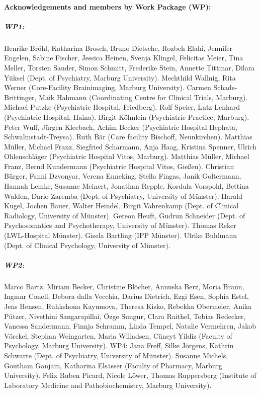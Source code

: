 \documentclass{article}
\begin{document}
    \paragraph{Acknowledgements and members by Work Package (WP):}
    \subparagraph{WP1:}
    Henrike Bröhl, Katharina Brosch, Bruno Dietsche, Rozbeh Elahi, Jennifer Engelen, Sabine Fischer, Jessica Heinen, Svenja Klingel, Felicitas Meier, Tina Meller, Torsten Sauder, Simon Schmitt, Frederike Stein, Annette Tittmar, Dilara Yüksel (Dept. of Psychiatry, Marburg University). Mechthild Wallnig, Rita Werner (Core-Facility Brainimaging, Marburg University). Carmen Schade-Brittinger, Maik Hahmann (Coordinating Centre for Clinical Trials, Marburg). Michael Putzke (Psychiatric Hospital, Friedberg). Rolf Speier, Lutz Lenhard (Psychiatric Hospital, Haina). Birgit Köhnlein (Psychiatric Practice, Marburg). Peter Wulf, Jürgen Kleebach, Achim Becker (Psychiatric Hospital Hephata, Schwalmstadt-Treysa). Ruth Bär (Care facility Bischoff, Neunkirchen). Matthias Müller, Michael Franz, Siegfried Scharmann, Anja Haag, Kristina Spenner, Ulrich Ohlenschläger (Psychiatric Hospital Vitos, Marburg). Matthias Müller, Michael Franz, Bernd Kundermann (Psychiatric Hospital Vitos, Gießen). Christian Bürger, Fanni Dzvonyar, Verena Enneking, Stella Fingas, Janik Goltermann, Hannah Lemke, Susanne Meinert, Jonathan Repple, Kordula Vorspohl, Bettina Walden, Dario Zaremba (Dept. of Psychiatry, University of Münster). Harald Kugel, Jochen Bauer, Walter Heindel, Birgit Vahrenkamp (Dept. of Clinical Radiology, University of Münster). Gereon Heuft, Gudrun Schneider (Dept. of Psychosomatics and Psychotherapy, University of Münster). Thomas Reker (LWL-Hospital Münster). Gisela Bartling (IPP Münster). Ulrike Buhlmann (Dept. of Clinical Psychology, University of Münster).
    \subparagraph{WP2:} Marco Bartz, Miriam Becker, Christine Blöcher, Annuska Berz, Moria Braun, Ingmar Conell, Debora dalla Vecchia, Darius Dietrich, Ezgi Esen, Sophia Estel, Jens Hensen, Ruhkshona Kayumova, Theresa Kisko, Rebekka Obermeier, Anika Pützer, Nivethini Sangarapillai, Özge Sungur, Clara Raithel, Tobias Redecker, Vanessa Sandermann, Finnja Schramm, Linda Tempel, Natalie Vermehren, Jakob Vörckel, Stephan Weingarten, Maria Willadsen, Cüneyt Yildiz (Faculty of Psychology, Marburg University).
    WP4: Jana Freff, Silke Jörgens, Kathrin Schwarte (Dept. of Psychiatry, University of Münster). Susanne Michels, Goutham Ganjam, Katharina Elsässer (Faculty of Pharmacy, Marburg University). Felix Ruben Picard, Nicole Löwer, Thomas Ruppersberg (Institute of Laboratory Medicine and Pathobiochemistry, Marburg University).
\end{document}
